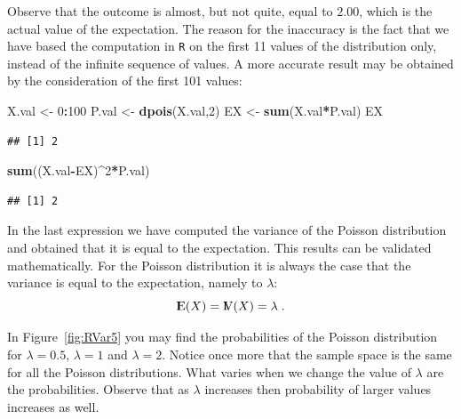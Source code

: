 \documentclass[]{krantz}
\makeatletter
\newenvironment{Shaded}{\begin{snugshade}}{\end{snugshade}}
\newcommand{\KeywordTok}[1]{\textcolor[rgb]{0.13,0.29,0.53}{\textbf{#1}}}
\newcommand{\DecValTok}[1]{\textcolor[rgb]{0.00,0.00,0.81}{#1}}
\newcommand{\StringTok}[1]{\textcolor[rgb]{0.31,0.60,0.02}{#1}}
\newcommand{\OperatorTok}[1]{\textcolor[rgb]{0.81,0.36,0.00}{\textbf{#1}}}
\newcommand{\NormalTok}[1]{#1}
\newcommand{\Expec}{{\rm I\kern-.3em E}}
\newcommand{\Var}{{\rm I\kern-.3em V}}
\newenvironment{kframe}{%
\medskip{}
\setlength{\fboxsep}{.8em}
 \def\at@end@of@kframe{}%
 \ifinner\ifhmode%
  \def\at@end@of@kframe{\end{minipage}}%
  \begin{minipage}{\columnwidth}%
 \fi\fi%
 \def\FrameCommand##1{\hskip\@totalleftmargin \hskip-\fboxsep
 \colorbox{shadecolor}{##1}\hskip-\fboxsep
     \hskip-\linewidth \hskip-\@totalleftmargin \hskip\columnwidth}%
 \MakeFramed {\advance\hsize-\width
   \@totalleftmargin\z@ \linewidth\hsize
   \@setminipage}}%
 {\par\unskip\endMakeFramed%
 \at@end@of@kframe}
\renewenvironment{Shaded}{\begin{kframe}}{\end{kframe}}
\theoremstyle{definition}
\theoremstyle{definition}
\theoremstyle{definition}
\theoremstyle{remark}
\makeatother
\begin{document}
Observe that the outcome is almost, but not quite, equal to \(2.00\),
which is the actual value of the expectation. The reason for the
inaccuracy is the fact that we have based the computation in \texttt{R}
on the first 11 values of the distribution only, instead of the infinite
sequence of values. A more accurate result may be obtained by the
consideration of the first 101 values:

\begin{Shaded}
\begin{Highlighting}[]
\NormalTok{X.val <-}\StringTok{ }\DecValTok{0}\OperatorTok{:}\DecValTok{100}
\NormalTok{P.val <-}\StringTok{ }\KeywordTok{dpois}\NormalTok{(X.val,}\DecValTok{2}\NormalTok{)}
\NormalTok{EX <-}\StringTok{ }\KeywordTok{sum}\NormalTok{(X.val}\OperatorTok{*}\NormalTok{P.val)}
\NormalTok{EX}
\end{Highlighting}
\end{Shaded}

\begin{verbatim}
## [1] 2
\end{verbatim}

\begin{Shaded}
\begin{Highlighting}[]
\KeywordTok{sum}\NormalTok{((X.val}\OperatorTok{-}\NormalTok{EX)}\OperatorTok{^}\DecValTok{2}\OperatorTok{*}\NormalTok{P.val)}
\end{Highlighting}
\end{Shaded}

\begin{verbatim}
## [1] 2
\end{verbatim}

In the last expression we have computed the variance of the Poisson
distribution and obtained that it is equal to the expectation. This
results can be validated mathematically. For the Poisson distribution it
is always the case that the variance is equal to the expectation, namely
to \(\lambda\): \[\Expec(X) = \Var(X) = \lambda\;.\]

In Figure~\ref{fig:RVar5} you may find the probabilities of the Poisson
distribution for \(\lambda = 0.5\), \(\lambda = 1\) and \(\lambda = 2\).
Notice once more that the sample space is the same for all the Poisson
distributions. What varies when we change the value of \(\lambda\) are
the probabilities. Observe that as \(\lambda\) increases then
probability of larger values increases as well.
\end{document}
